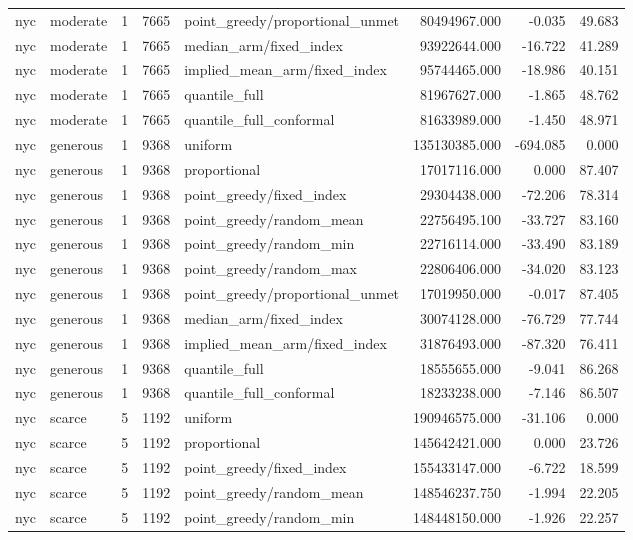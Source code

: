 \begin{tabular}{llrrlrrr}
nyc & moderate & 1 & 7665 & point\_greedy/proportional\_unmet & 80494967.000 & -0.035 & 49.683 \\
nyc & moderate & 1 & 7665 & median\_arm/fixed\_index & 93922644.000 & -16.722 & 41.289 \\
nyc & moderate & 1 & 7665 & implied\_mean\_arm/fixed\_index & 95744465.000 & -18.986 & 40.151 \\
nyc & moderate & 1 & 7665 & quantile\_full & 81967627.000 & -1.865 & 48.762 \\
nyc & moderate & 1 & 7665 & quantile\_full\_conformal & 81633989.000 & -1.450 & 48.971 \\
nyc & generous & 1 & 9368 & uniform & 135130385.000 & -694.085 & 0.000 \\
nyc & generous & 1 & 9368 & proportional & 17017116.000 & 0.000 & 87.407 \\
nyc & generous & 1 & 9368 & point\_greedy/fixed\_index & 29304438.000 & -72.206 & 78.314 \\
nyc & generous & 1 & 9368 & point\_greedy/random\_mean & 22756495.100 & -33.727 & 83.160 \\
nyc & generous & 1 & 9368 & point\_greedy/random\_min & 22716114.000 & -33.490 & 83.189 \\
nyc & generous & 1 & 9368 & point\_greedy/random\_max & 22806406.000 & -34.020 & 83.123 \\
nyc & generous & 1 & 9368 & point\_greedy/proportional\_unmet & 17019950.000 & -0.017 & 87.405 \\
nyc & generous & 1 & 9368 & median\_arm/fixed\_index & 30074128.000 & -76.729 & 77.744 \\
nyc & generous & 1 & 9368 & implied\_mean\_arm/fixed\_index & 31876493.000 & -87.320 & 76.411 \\
nyc & generous & 1 & 9368 & quantile\_full & 18555655.000 & -9.041 & 86.268 \\
nyc & generous & 1 & 9368 & quantile\_full\_conformal & 18233238.000 & -7.146 & 86.507 \\
nyc & scarce & 5 & 1192 & uniform & 190946575.000 & -31.106 & 0.000 \\
nyc & scarce & 5 & 1192 & proportional & 145642421.000 & 0.000 & 23.726 \\
nyc & scarce & 5 & 1192 & point\_greedy/fixed\_index & 155433147.000 & -6.722 & 18.599 \\
nyc & scarce & 5 & 1192 & point\_greedy/random\_mean & 148546237.750 & -1.994 & 22.205 \\
nyc & scarce & 5 & 1192 & point\_greedy/random\_min & 148448150.000 & -1.926 & 22.257 \\

\end{tabular}
